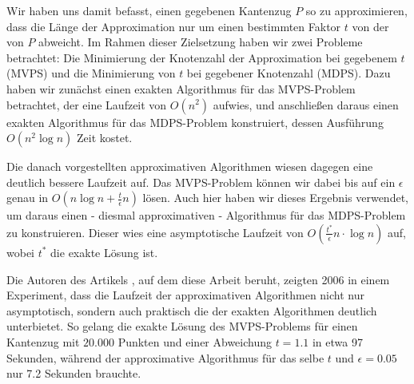 \documentclass[11pt]{article}
\begin{document}
    Wir haben uns damit befasst, einen gegebenen Kantenzug $P$ so zu approximieren, dass die Länge der Approximation nur um einen bestimmten Faktor $t$ von der von $P$ abweicht. 
    Im Rahmen dieser Zielsetzung haben wir zwei Probleme betrachtet: Die Minimierung der Knotenzahl der Approximation bei gegebenem $t$ (MVPS) und die Minimierung von $t$ bei gegebener Knotenzahl (MDPS).
    Dazu haben wir zunächst einen exakten Algorithmus für das MVPS-Problem betrachtet, der eine Laufzeit von $O(n^2)$ aufwies, und anschließen daraus einen exakten Algorithmus für das MDPS-Problem konstruiert, dessen Ausführung $O(n^2 \log n)$ Zeit kostet.
 
    Die danach vorgestellten approximativen Algorithmen wiesen dagegen eine deutlich bessere Laufzeit auf.
    Das MVPS-Problem können wir dabei bis auf ein $\epsilon$ genau in $O(n \log n + \frac{t}{\epsilon}n)$ lösen.
    Auch hier haben wir dieses Ergebnis verwendet, um daraus einen - diesmal approximativen - Algorithmus für das MDPS-Problem zu konstruieren. Dieser wies eine asymptotische Laufzeit von $O(\frac{t^*}{\epsilon}n \cdot \log n)$ auf, wobei $t^*$ die exakte Lösung ist.
    
    Die Autoren des Artikels \cite{gudmundsson}, auf dem diese Arbeit beruht, zeigten 2006 in einem Experiment, dass die Laufzeit der approximativen Algorithmen nicht nur asymptotisch, sondern auch praktisch die der exakten Algorithmen deutlich unterbietet.
    So gelang die exakte Lösung des MVPS-Problems für einen Kantenzug mit $20.000$ Punkten und einer Abweichung $t = 1.1$ in etwa 97 Sekunden, während der approximative Algorithmus für das selbe $t$ und $\epsilon = 0.05$ nur 7.2 Sekunden brauchte.

    
    
\end{document}
